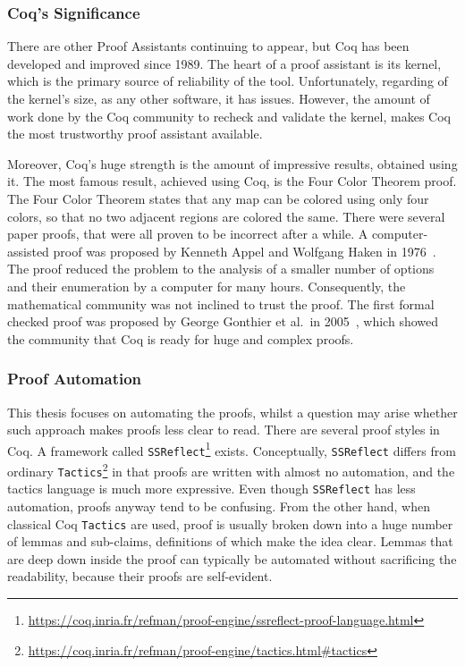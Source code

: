 \subsubsection{Coq's Significance}
There are other Proof Assistants continuing to appear, but Coq has been developed and improved since 1989. The heart of a proof assistant is its kernel, which is the primary source of reliability of the tool. Unfortunately, regarding of the kernel's size, as any other software, it has issues. However, the amount of work done by the Coq community to recheck and validate the kernel, makes Coq the most trustworthy proof assistant available.

Moreover, Coq's huge strength is the amount of impressive results, obtained using it. The most famous result, achieved using Coq, is the Four Color Theorem proof. The Four Color Theorem states that any map can be colored using only four colors, so that no two adjacent regions are colored the same. There were several paper proofs, that were all proven to be incorrect after a while. A computer-assisted proof was proposed by Kenneth Appel and Wolfgang Haken in 1976~\cite{appel_4color1976}. The proof reduced the problem to the analysis of a smaller number of options and their enumeration by a computer for many hours. Consequently, the mathematical community was not inclined to trust the proof. The first formal checked proof was proposed by George Gonthier et al.\ in 2005~\cite{Gonthier2008FormalPF}, which showed the community that Coq is ready for huge and complex proofs. 

\subsubsection{Proof Automation}
This thesis focuses on automating the proofs, whilst a question may arise whether such approach makes proofs less clear to read. There are several proof styles in Coq. A framework called \texttt{SSReflect}\footnote{\href{https://coq.inria.fr/refman/proof-engine/ssreflect-proof-language.html}{https://coq.inria.fr/refman/proof-engine/ssreflect-proof-language.html}} exists. Conceptually, \texttt{SSReflect} differs from ordinary \texttt{Tactics}\footnote{\href{https://coq.inria.fr/refman/proof-engine/tactics.html\#tactics}{https://coq.inria.fr/refman/proof-engine/tactics.html\#tactics}} in that proofs are written with almost no automation, and the tactics language is much more expressive. Even though \texttt{SSReflect} has less automation, proofs anyway tend to be confusing. From the other hand, when classical Coq \texttt{Tactics} are used, proof is usually broken down into a huge number of lemmas and sub-claims, definitions of which make the idea clear. Lemmas that are deep down inside the proof can typically be automated without sacrificing the readability, because their proofs are self-evident. 

